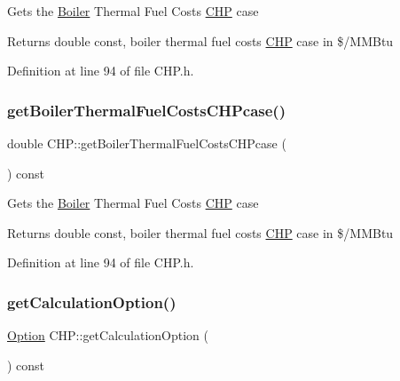 Gets the \hyperlink{class_boiler}{Boiler} Thermal Fuel Costs \hyperlink{class_c_h_p}{C\+HP} case

\begin{DoxyReturn}{Returns}
double const, boiler thermal fuel costs \hyperlink{class_c_h_p}{C\+HP} case in \$/\+M\+M\+Btu 
\end{DoxyReturn}


Definition at line 94 of file C\+H\+P.\+h.

\mbox{\label{class_c_h_p_ace1d96aacf328bd62f01e0eceaae19f6}} 
\subsubsection{\texorpdfstring{get\+Boiler\+Thermal\+Fuel\+Costs\+C\+H\+Pcase()}{getBoilerThermalFuelCostsCHPcase()}\hspace{0.1cm}{\footnotesize\ttfamily [3/3]}}
{\footnotesize\ttfamily double C\+H\+P\+::get\+Boiler\+Thermal\+Fuel\+Costs\+C\+H\+Pcase (\begin{DoxyParamCaption}{ }\end{DoxyParamCaption}) const\hspace{0.3cm}{\ttfamily [inline]}}

Gets the \hyperlink{class_boiler}{Boiler} Thermal Fuel Costs \hyperlink{class_c_h_p}{C\+HP} case

\begin{DoxyReturn}{Returns}
double const, boiler thermal fuel costs \hyperlink{class_c_h_p}{C\+HP} case in \$/\+M\+M\+Btu 
\end{DoxyReturn}


Definition at line 94 of file C\+H\+P.\+h.

\mbox{\label{class_c_h_p_a858f0201818f637331e0d06d3171bee7}} 
\subsubsection{\texorpdfstring{get\+Calculation\+Option()}{getCalculationOption()}\hspace{0.1cm}{\footnotesize\ttfamily [1/3]}}
{\footnotesize\ttfamily \hyperlink{class_c_h_p_ac82f530412021ace928a7e95c1295d06}{Option} C\+H\+P\+::get\+Calculation\+Option (\begin{DoxyParamCaption}{ }\end{DoxyParamCaption}) const\hspace{0.3cm}{\ttfamily [inline]}}

